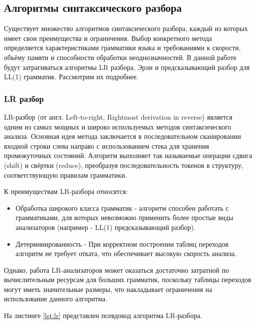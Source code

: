 \documentclass[14pt, russian]{scrartcl}
\begin{document}
\subsection{Алгоритмы синтаксического разбора}

Существует множество алгоритмов синтаксического разбора, каждый из которых имеет свои преимущества и ограничения.
Выбор конкретного метода определяется характеристиками грамматики языка и требованиями к скорости,
объёму памяти и способности обработки неоднозначностей. В данной работе будут затрагиваться алгоритмы LR разбора,
Эрли и предсказывающий разбор для LL(1) грамматик. Рассмотрим их подробнее.

\subsubsection{LR разбор}

LR-разбор (от англ. Left-to-right, Rightmost derivation in reverse) является одним из самых мощных и широко
используемых методов синтаксического анализа. Основная идея метода заключается в последовательном сканировании
входной строки слева направо с использованием стека для хранения промежуточных состояний. Алгоритм выполняет
так называемые операции сдвига (shift) и свёртки (reduce), преобразуя последовательность токенов в структуру,
соответствующую правилам грамматики.

К преимуществам LR-разбора относятся:

\begin{itemize}
	\item Обработка широкого класса грамматик - алгоритм способен работать с грамматиками, для которых невозможно
	применить более простые виды анализаторов (например - LL(1) предсказывающий разбор).
	\item Детерминированность - При корректном построении таблиц переходов алгоритм не требует отката, что
	обеспечивает высокую скорость анализа.
\end{itemize}

Однако, работа LR-анализаторов может оказаться достаточно затратной по вычислительным ресурсам для больших грамматик,
поскольку таблицы переходов могут иметь значительные размеры, что накладывает ограничения на использование
данного алгоритма.

На листинге \ref{lst:lr} представлен псевдокод алгоритма LR-разбора.
\end{document}
